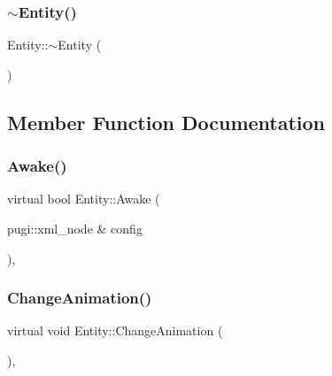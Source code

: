 \mbox{\label{class_entity_adf6d3f7cb1b2ba029b6b048a395cc8ae}} 
\subsubsection{\texorpdfstring{$\sim$Entity()}{~Entity()}}
{\footnotesize\ttfamily Entity\+::$\sim$\+Entity (\begin{DoxyParamCaption}{ }\end{DoxyParamCaption})}



\subsection{Member Function Documentation}
\mbox{\label{class_entity_a4ee31889b59ec66b53c32639346969cb}} 
\subsubsection{\texorpdfstring{Awake()}{Awake()}}
{\footnotesize\ttfamily virtual bool Entity\+::\+Awake (\begin{DoxyParamCaption}\item[{pugi\+::xml\+\_\+node \&}]{config }\end{DoxyParamCaption})\hspace{0.3cm}{\ttfamily [inline]}, {\ttfamily [virtual]}}

\mbox{\label{class_entity_a54f27cfe16de1a39fb77bda1368fa40e}} 
\subsubsection{\texorpdfstring{ChangeAnimation()}{ChangeAnimation()}}
{\footnotesize\ttfamily virtual void Entity\+::\+Change\+Animation (\begin{DoxyParamCaption}{ }\end{DoxyParamCaption})\hspace{0.3cm}{\ttfamily [inline]}, {\ttfamily [virtual]}}

\mbox{\label{class_entity_af018d340c1d6d20e27fe2bb55d7c7260}} 
